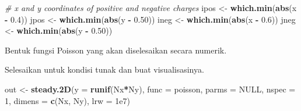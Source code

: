 \documentclass[
]{book}
\newenvironment{Shaded}{\begin{snugshade}}{\end{snugshade}}
\newcommand{\AttributeTok}[1]{\textcolor[rgb]{0.13,0.29,0.53}{#1}}
\newcommand{\CommentTok}[1]{\textcolor[rgb]{0.56,0.35,0.01}{\textit{#1}}}
\newcommand{\ConstantTok}[1]{\textcolor[rgb]{0.56,0.35,0.01}{#1}}
\newcommand{\ControlFlowTok}[1]{\textcolor[rgb]{0.13,0.29,0.53}{\textbf{#1}}}
\newcommand{\DecValTok}[1]{\textcolor[rgb]{0.00,0.00,0.81}{#1}}
\newcommand{\FloatTok}[1]{\textcolor[rgb]{0.00,0.00,0.81}{#1}}
\newcommand{\FunctionTok}[1]{\textcolor[rgb]{0.13,0.29,0.53}{\textbf{#1}}}
\newcommand{\NormalTok}[1]{#1}
\newcommand{\OtherTok}[1]{\textcolor[rgb]{0.56,0.35,0.01}{#1}}
\newcommand{\SpecialCharTok}[1]{\textcolor[rgb]{0.81,0.36,0.00}{\textbf{#1}}}
\theoremstyle{definition}
\theoremstyle{definition}
\theoremstyle{definition}
\theoremstyle{definition}
\theoremstyle{remark}
\begin{document}
\begin{Shaded}
\begin{Highlighting}[]
\CommentTok{\# x and y coordinates of positive and negative charges}
\NormalTok{ipos }\OtherTok{\textless{}{-}} \FunctionTok{which.min}\NormalTok{(}\FunctionTok{abs}\NormalTok{(x }\SpecialCharTok{{-}} \FloatTok{0.4}\NormalTok{))}
\NormalTok{jpos }\OtherTok{\textless{}{-}} \FunctionTok{which.min}\NormalTok{(}\FunctionTok{abs}\NormalTok{(y }\SpecialCharTok{{-}} \FloatTok{0.50}\NormalTok{))}
\NormalTok{ineg }\OtherTok{\textless{}{-}} \FunctionTok{which.min}\NormalTok{(}\FunctionTok{abs}\NormalTok{(x }\SpecialCharTok{{-}} \FloatTok{0.6}\NormalTok{))}
\NormalTok{jneg }\OtherTok{\textless{}{-}} \FunctionTok{which.min}\NormalTok{(}\FunctionTok{abs}\NormalTok{(y }\SpecialCharTok{{-}} \FloatTok{0.50}\NormalTok{))}
\end{Highlighting}
\end{Shaded}

Bentuk fungsi Poisson yang akan diselesaikan secara numerik.

\begin{Shaded}
\end{Shaded}

Selesaikan untuk kondisi tunak dan buat visualisasinya.

\begin{Shaded}
\begin{Highlighting}[]
\NormalTok{out }\OtherTok{\textless{}{-}} \FunctionTok{steady.2D}\NormalTok{(}\AttributeTok{y =} \FunctionTok{runif}\NormalTok{(Nx}\SpecialCharTok{*}\NormalTok{Ny), }
                 \AttributeTok{func =}\NormalTok{ poisson, }
                 \AttributeTok{parms =} \ConstantTok{NULL}\NormalTok{, }
                 \AttributeTok{nspec =} \DecValTok{1}\NormalTok{, }
                 \AttributeTok{dimens =} \FunctionTok{c}\NormalTok{(Nx, Ny), }
                 \AttributeTok{lrw =} \FloatTok{1e7}\NormalTok{)}
\end{Highlighting}
\end{Shaded}
\end{document}
